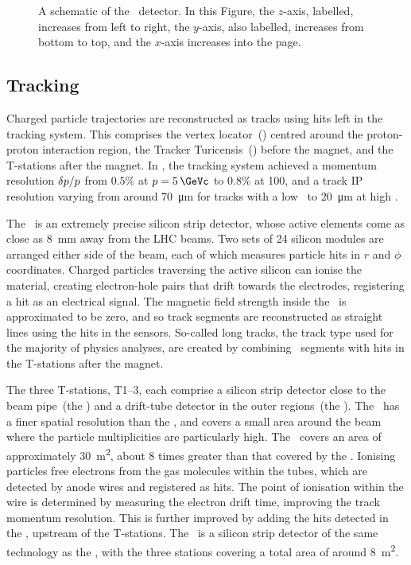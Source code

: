 \begin{figure}
  \centering
  
  \caption{%
    A schematic of the \lhcb\ detector.
    In this Figure, the $z$-axis, labelled, increases from left to right, the 
    $y$-axis, also labelled, increases from bottom to top, and the $x$-axis 
    increases into the page.
  }
  \label{fig:intro:lhcb:detector}
\end{figure}

\subsection{Tracking}
\label{chap:intro:lhcb:detector:tracking}

Charged particle trajectories are reconstructed as tracks using hits left in 
the tracking system.
This comprises the vertex locator~(\velo) centred around the proton-proton 
interaction region, the Tracker Turicensis~(\ttracker) before the magnet, and 
the T-stations after the magnet.
In \runone, the tracking system achieved a momentum resolution 
$\delta{\ensuremath{p}}/p$ from $0.5\%$ at $\ptot = \SI{5}{\GeVc}$ to $0.8\%$ at 
\SI{100}{\GeVc}, and a track \acl{IP} resolution varying from around 
\SI{70}{\micro\metre} for tracks with a low \pT\ to \SI{20}{\micro\metre} at 
high \pT.

The \velo\ is an extremely precise silicon strip detector, whose active 
elements come as close as \SI{8}{\milli\metre} away from the \ac{LHC} beams.
Two sets of 24 silicon modules are arranged either side of the beam, each of 
which measures particle hits in $r$ and $\phi$ coordinates.
Charged particles traversing the active silicon can ionise the material, 
creating electron-hole pairs that drift towards the electrodes, registering a 
hit as an electrical signal.
The magnetic field strength inside the \velo\ is approximated to be zero, and 
so track segments are reconstructed as straight lines using the hits in the 
sensors.
So-called long tracks, the track type used for the majority of physics 
analyses, are created by combining \velo\ segments with hits in the T-stations 
after the magnet.

The three T-stations, T1--3, each comprise a silicon strip detector close to 
the beam pipe~(the \itracker) and a drift-tube detector in the outer 
regions~(the \otracker).
The \itracker\ has a finer spatial resolution than the \otracker, and covers a 
small area around the beam where the particle multiplicities are particularly 
high.
The \otracker\ covers an area of approximately \SI{30}{\metre\squared}, about 8 
times greater than that covered by the \itracker.
Ionising particles free electrons from the gas molecules within the tubes, 
which are detected by anode wires and registered as hits.
The point of ionisation within the wire is determined by measuring the electron 
drift time, improving the track momentum resolution.
This is further improved by adding the hits detected in the \ttracker, upstream 
of the T-stations.
The \ttracker\ is a silicon strip detector of the same technology as the 
\itracker, with the three stations covering a total area of around 
\SI{8}{\metre\squared}.

